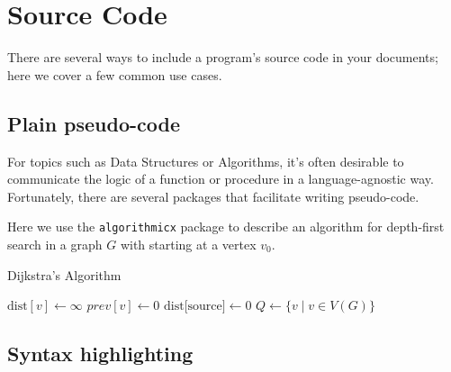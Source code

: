 \documentclass[11pt,letterpaper,titlepage]{article}
\numberwithin{equation}{section}
\numberwithin{figure}{section}
\numberwithin{table}{section}
\numberwithin{algorithm}{section}
\theoremstyle{definition}
\begin{document}
\section{Source Code}

There are several ways to include a program's source code in your documents; here we cover a few common use cases.

 \subsection{Plain pseudo-code}
 
 For topics such as Data Structures or Algorithms, it's often desirable to communicate the logic of a function or procedure in a language-agnostic way. Fortunately, there are several packages that facilitate writing pseudo-code. 
 
 Here we use the \verb$algorithmicx$ package to describe an algorithm for depth-first search in a graph $G$ with starting at a vertex $v_0$. 
 
    \begin{algorithm}[H]
    \caption{Dijkstra's Algorithm}\label{Dijkstra}
    \begin{algorithmic}[1]
        \State $\text{dist}[v] \gets \infty$
        \State $\textit{prev}[v] \gets 0$
        \State $\text{dist[source]} \gets 0$
        \State $Q \gets \{v \mid v\in V(G)\}$
                \EndIf
            \EndFor
        \EndWhile
    \EndFor
    \EndProcedure
    \end{algorithmic}
    \end{algorithm}
    

 \subsection{Syntax highlighting}
 
\end{document}

